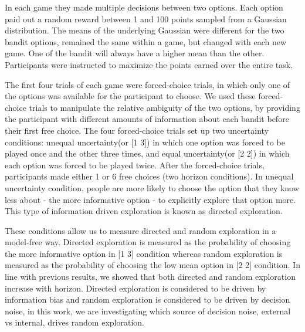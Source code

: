 \documentclass[12pt]{article}
\begin{document}
	In each game they made multiple decisions between two options. Each option paid out a random reward between 1 and 100 points sampled from a Gaussian distribution. The means of the underlying Gaussian were different for the two bandit options, remained the same within a game, but changed with each new game. One of the bandit will always have a higher mean than the other. Participants were instructed to maximize the points earned over the entire task.
	
	The first four trials of each game were forced-choice trials, in which only one of the options was available for the participant to choose. We used these forced-choice trials to manipulate the relative ambiguity of the two options, by providing the participant with different amounts of information about each bandit before their first free choice. The four forced-choice trials set up two uncertainty conditions: unequal uncertainty(or [1 3]) in which one option was forced to be played once and the other three times, and equal uncertainty(or [2 2]) in which each option was forced to be played twice. After the forced-choice trials, participants made either 1 or 6 free choices (two horizon conditions). In unequal uncertainty condition, people are more likely to choose the option that they know less about - the more informative option - to explicitly explore that option more. This type of information driven exploration is known as directed exploration.
	
	These conditions allow us to measure directed and random exploration in a model-free way. Directed exploration is measured as the probability of choosing the more informative option in [1 3] condition whereas random exploration is measured as the probability of choosing the low mean option in [2 2] condition. In line with previous results, we showed that both directed and random exploration increase with horizon. Directed exploration is considered to be driven by information bias and random exploration is considered to be driven by decision noise, in this work, we are investigating which source of decision noise, external vs internal, drives random exploration.
	
	
\end{document}
